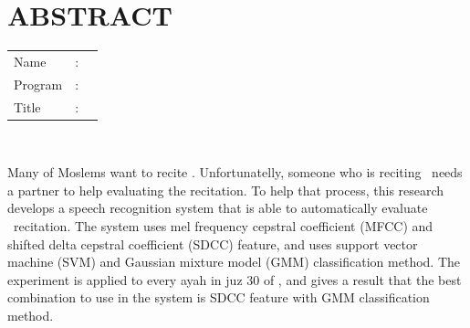 %
%
%

	\chapter*{ABSTRACT}

\vspace*{0.2cm}

\noindent \begin{tabular}{l l p{11.0cm}}
	Name&: & \penulis \\
	Program&: & \programEng \\
	Title&: & \judulInggris \\
\end{tabular} \\ 

\vspace*{0.5cm}

\noindent 
Many of Moslems want to recite \quran. Unfortunatelly, someone who is reciting \quran~needs a partner to help evaluating the recitation. To help that process, this research develops a speech recognition system that is able to automatically evaluate \quran~recitation. The system uses mel frequency cepstral coefficient (MFCC) and shifted delta cepstral coefficient (SDCC) feature, and uses support vector machine (SVM) and Gaussian mixture model (GMM) classification method. The experiment is applied to every ayah in juz 30 of \quran, and gives a result that the best combination to use in the system is SDCC feature with GMM classification method. \\


